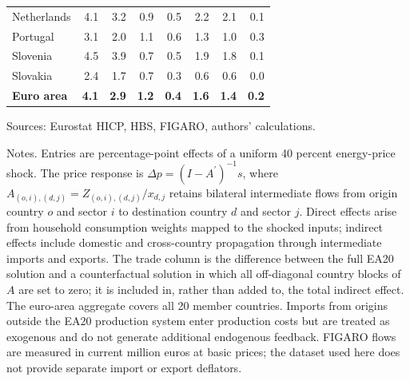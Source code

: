 \begin{table}[H]
\begin{tabular}{lrrrrrrr}
 \\
Netherlands & 4.1 & 3.2 & 0.9 & 0.5 & 2.2 & 2.1 & 0.1
 \\
Portugal & 3.1 & 2.0 & 1.1 & 0.6 & 1.3 & 1.0 & 0.3
 \\
Slovenia & 4.5 & 3.9 & 0.7 & 0.5 & 1.9 & 1.8 & 0.1
 \\
Slovakia & 2.4 & 1.7 & 0.7 & 0.3 & 0.6 & 0.6 & 0.0
 \\
\midrule
\textbf{Euro area} & \textbf{4.1} & \textbf{2.9} & \textbf{1.2} & \textbf{0.4} & \textbf{1.6} & \textbf{1.4} & \textbf{0.2}
 \\
\bottomrule
\end{tabular}
\par\vspace{0.35em}\footnotesize\noindent Sources: Eurostat HICP, HBS, FIGARO, authors' calculations.
\par\vspace{0.25em}\footnotesize\noindent Notes. Entries are percentage-point effects of a uniform 40 percent energy-price shock. The price response is $\Delta p = (I - A^{\prime})^{-1}s$, where $A_{(o,i),(d,j)}=Z_{(o,i),(d,j)}/x_{d,j}$ retains bilateral intermediate flows from origin country $o$ and sector $i$ to destination country $d$ and sector $j$. Direct effects arise from household consumption weights mapped to the shocked inputs; indirect effects include domestic and cross-country propagation through intermediate imports and exports. The trade column is the difference between the full EA20 solution and a counterfactual solution in which all off-diagonal country blocks of $A$ are set to zero; it is included in, rather than added to, the total indirect effect. The euro-area aggregate covers all 20 member countries. Imports from origins outside the EA20 production system enter production costs but are treated as exogenous and do not generate additional endogenous feedback. FIGARO flows are measured in current million euros at basic prices; the dataset used here does not provide separate import or export deflators.
\end{table}
\vspace{0.6em}
